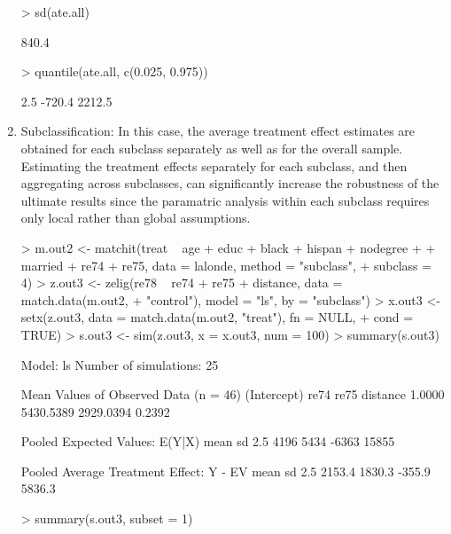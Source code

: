 \begin{enumerate}
\begin{Schunk}
\begin{Soutput}
\end{Soutput}
\begin{Sinput}
> sd(ate.all)
\end{Sinput}
\begin{Soutput}
[1] 840.4

\end{Soutput}
\begin{Sinput}
> quantile(ate.all, c(0.025, 0.975))
\end{Sinput}
\begin{Soutput}
  2.5%  97.5% 
-720.4 2212.5 

\end{Soutput}
\end{Schunk}
  
\item Subclassification: In this case, the average treatment effect
  estimates are obtained for each subclass separately as well as
  for the overall sample.  Estimating the treatment effects separately 
  for each subclass, and then aggregating across subclasses, can significantly
  increase the robustness of the ultimate results since the paramatric analysis
  within each subclass requires only local rather than global assumptions.

\begin{Schunk}
\begin{Sinput}
> m.out2 <- matchit(treat ~ age + educ + black + hispan + nodegree + 
+     married + re74 + re75, data = lalonde, method = "subclass", 
+     subclass = 4)
> z.out3 <- zelig(re78 ~ re74 + re75 + distance, data = match.data(m.out2, 
+     "control"), model = "ls", by = "subclass")
> x.out3 <- setx(z.out3, data = match.data(m.out2, "treat"), fn = NULL, 
+     cond = TRUE)
> s.out3 <- sim(z.out3, x = x.out3, num = 100)
> summary(s.out3)
\end{Sinput}
\begin{Soutput}

  Model: ls 
  Number of simulations: 25 

Mean Values of Observed Data (n = 46) 
(Intercept)        re74        re75    distance 
     1.0000   5430.5389   2929.0394      0.2392 

Pooled Expected Values: E(Y|X)
 mean    sd  2.5% 97.5% 
 4196  5434 -6363 15855 

Pooled Average Treatment Effect: Y - EV
  mean     sd   2.5%  97.5% 
2153.4 1830.3 -355.9 5836.3 

\end{Soutput}
\begin{Sinput}
> summary(s.out3, subset = 1)
\end{Sinput}
\begin{Soutput}


\end{Soutput}
\end{Schunk}
\end{enumerate}
